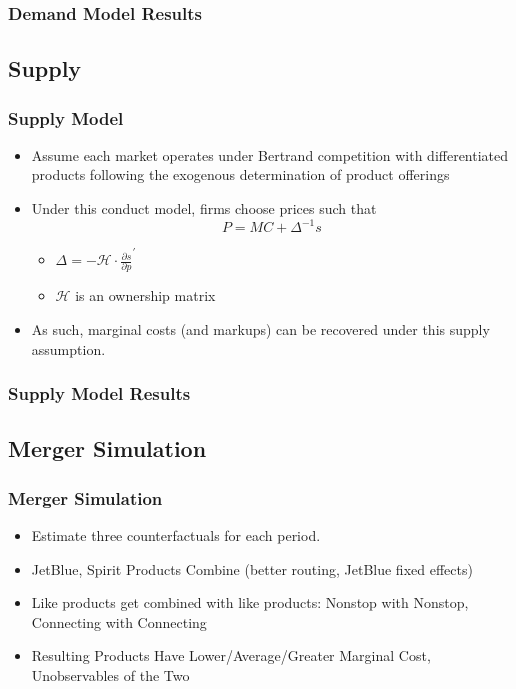 \documentclass[xcolor=dvipsnames]{beamer}
\let\Oldsubsection\subsection
\renewcommand{\subsection}{\FloatBarrier\Oldsubsection}
\begin{document}
    \begin{frame}
        \frametitle{Demand Model Results}
        \begin{center}   
        \end{center}
    \end{frame}
    
    \subsection{Supply}
    \begin{frame}
        \frametitle{Supply Model}
        \begin{itemize}
            \item Assume each market operates under Bertrand competition with differentiated products following the exogenous determination of product offerings
            \item Under this conduct model, firms choose prices such that  \vspace{-4mm} \[P = MC + \Delta^{-1} s\]
             \vspace{-8mm}
            \begin{itemize}
                \item  $\Delta = - \mathcal{H} \cdot \frac{\partial s}{\partial p}^{'}$
                \item $\mathcal{H}$ is an ownership matrix
            \end{itemize}
            \item As such, marginal costs (and markups) can be recovered under this supply assumption. 
        \end{itemize}
    \end{frame}

    \begin{frame}
        \frametitle{Supply Model Results}
    \end{frame}

    \subsection{Merger Simulation}
   	\begin{frame}
		\frametitle{Merger Simulation}
			\begin{itemize}
            \item Estimate three counterfactuals for each period.
				\item JetBlue, Spirit Products Combine (better routing, JetBlue fixed effects)
                \item Like products get combined with like products: Nonstop with Nonstop, Connecting with Connecting
				\item Resulting Products Have Lower/Average/Greater Marginal Cost, Unobservables of the Two
        \end{itemize}
	\end{frame}
\end{document}
